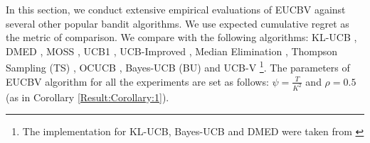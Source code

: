 In this section, we conduct extensive empirical evaluations of EUCBV against several other popular bandit algorithms. We use expected cumulative regret as the metric of comparison. We compare with the following algorithms:  KL-UCB \cite{garivier2011kl}, DMED \cite{honda2010asymptotically}, MOSS \cite{audibert2009minimax}, UCB1 \cite{auer2002finite}, UCB-Improved \cite{auer2010ucb}, Median Elimination \cite{even2006action}, Thompson Sampling (TS) \cite{agrawal2011analysis}, OCUCB \cite{lattimore2015optimally}, Bayes-UCB (BU) \cite{kaufmann2012bayesian} and UCB-V \cite{audibert2009exploration}\footnote{The implementation for KL-UCB, Bayes-UCB and DMED were taken from \cite{CapGarKau12}}. The parameters of EUCBV algorithm for all the experiments are set as follows: $\psi=\frac{T}{K^2}$ and $\rho =0.5$ (as in Corollary \ref{Result:Corollary:1}).

